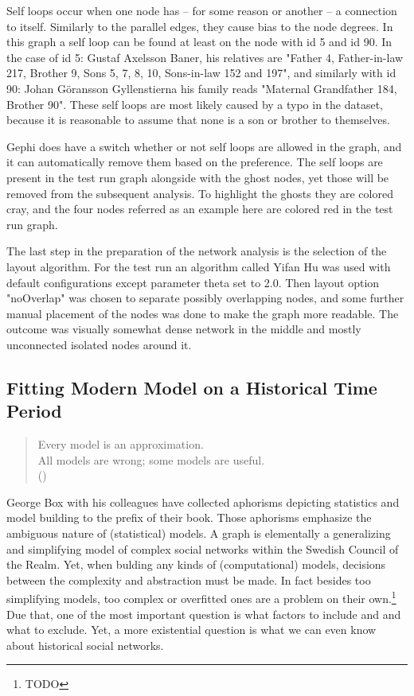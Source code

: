 Self loops occur when one node has – for some reason or another – a connection to itself. Similarly to the parallel edges, they cause bias to the node degrees. In this graph a self loop can be found at least on the node with id 5 and id 90. In the case of id 5: Gustaf Axelsson Baner, his relatives are "Father 4, Father-in-law 217, Brother 9, Sons 5, 7, 8, 10, Sons-in-law 152 and 197", and similarly with id 90: Johan Göransson Gyllenstierna his family reads "Maternal Grandfather 184, Brother 90". These self loops are most likely caused by a typo in the dataset, because it is reasonable to assume that none is a son or brother to themselves.
 
Gephi does have a switch whether or not self loops are allowed in the graph, and it can automatically remove them based on the preference. The self loops are present in the test run graph alongside with the ghost nodes, yet those will be removed from the subsequent analysis. To highlight the ghosts they are colored cray, and the four nodes referred as an example here are colored red in the test run graph.

The last step in the preparation of the network analysis is the selection of the layout algorithm. For the test run an algorithm called Yifan Hu was used with default configurations except parameter theta set to 2.0. Then layout option "noOverlap" was chosen to separate possibly overlapping nodes, and some further manual placement of the nodes was done to make the graph more readable. The outcome was visually somewhat dense network in the middle and mostly unconnected isolated nodes around it. 

\subsection{Fitting Modern Model on a Historical Time Period}
\begin{quote}
	Every model is an approximation.\\
	All models are wrong; some models are useful.\\
	(\cite[prefix]{statisticsfor})
\end{quote}

George Box with his colleagues have collected aphorisms depicting statistics and model building to the prefix of their book. Those aphorisms emphasize the ambiguous nature of (statistical) models. A graph is elementally a generalizing and simplifying model of complex social networks within the Swedish Council of the Realm. Yet, when bulding any kinds of (computational) models, decisions between the complexity and abstraction must be made. In fact besides too simplifying models, too complex or overfitted ones are a problem on their own.\footnote{TODO} Due that, one of the most important question is what factors to include and and what to exclude. Yet, a more existential question is what we can even know about historical social networks. 

